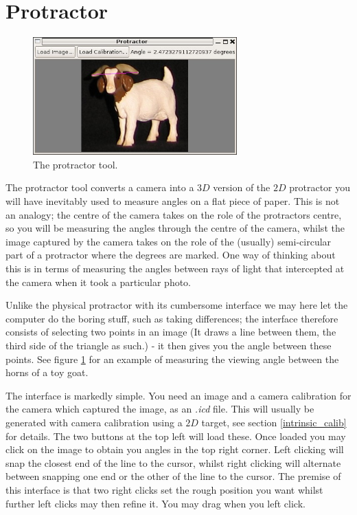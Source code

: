 \documentclass[10pt,a4paper,twoside]{article}
\begin{document}
\section{Protractor}

\begin{figure}
 \centering
 \includegraphics[width=0.7\textwidth]{screenshots/protractor_goat}
 \caption{The protractor tool.}
 \label{fig:goat_angle}
\end{figure}

The protractor tool converts a camera into a $3D$ version of the $2D$ protractor you will have inevitably used to measure angles on a flat piece of paper.
This is not an analogy; the centre of the camera takes on the role of the protractors centre, so you will be measuring the angles through the centre of the camera, whilst the image captured by the camera takes on the role of the (usually) semi-circular part of a protractor where the degrees are marked.
One way of thinking about this is in terms of measuring the angles between rays of light that intercepted at the camera when it took a particular photo.

Unlike the physical protractor with its cumbersome interface we may here let the computer do the boring stuff, such as taking differences; the interface therefore consists of selecting two points in an image (It draws a line between them, the third side of the triangle as such.) - it then gives you the angle between these points.
See figure \ref{fig:goat_angle} for an example of measuring the viewing angle between the horns of a toy goat.

The interface is markedly simple. You need an image and a camera calibration for the camera which captured the image, as an \emph{.icd} file. This will usually be generated with camera calibration using a $2D$ target, see section \ref{intrinsic_calib} for details. The two buttons at the top left will load these. Once loaded you may click on the image to obtain you angles in the top right corner. Left clicking will snap the closest end of the line to the cursor, whilst right clicking will alternate between snapping one end or the other of the line to the cursor. The premise of this interface is that two right clicks set the rough position you want whilst further left clicks may then refine it. You may drag when you left click.
\end{document}
